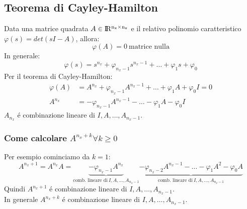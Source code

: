 \documentclass[../main.tex]{subfiles}
\begin{document}
	\subsection{Teorema di Cayley-Hamilton}
		Data una matrice quadrata $ A \in \rm I\!R^{n_x \times n_x} $ e il relativo polinomio caratteristico $ \varphi(s) = det(sI-A) $, allora:
		\[ \varphi(A) = 0\ \text{matrice nulla} \]
		In generale:
		\[ \varphi(s) = s^{n_x} + \varphi_{n_x-1} s^{n_x-1} + \dots + \varphi_1 s + \varphi_0 \]
		Per il teorema di Cayley-Hamilton:
		\begin{align}
			\label{th_ch}
			\varphi(A) &= A^{n_x} + \varphi_{n_x-1} A^{n_x-1} + \dots + \varphi_1 A + \varphi_0 I = 0\\
			A^{n_x} &= -\varphi_{n_x-1} A^{n_x-1} - \dots - \varphi_1 A - \varphi_0 I
		\end{align}
		$ A_{n_x} $ \'e combinazione lineare di $ I, A, \dots, A_{n_x-1} $.
		
	\subsubsection{Come calcolare $ A^{n_x+k} \forall k \geq 0 $}
		Per esempio cominciamo da $ k = 1 $:
		\[ A^{n_x+1} = A^{n_x} A = \underbrace{- \varphi_{n_x-1} A^{n_x}}_{\text{comb. lineare di}\ I, A, \dots, A_{n_x-1}} \underbrace{- \varphi_{n_x-2} A^{n_x-1} - \dots - \varphi_1 A^2 - \varphi_0 A}_{\text{comb. lineare di}\ I, A, \dots, A_{n_x-1}} \]
		Quindi $ A^{n_x+1} $ \'e combinazione lineare di $ I, A, \dots, A_{n_x-1} $.\\
		In generale $ A^{n_x+k} $ \'e combinazione lineare di $ I, A, \dots, A_{n_x-1} $.
		
\end{document}

